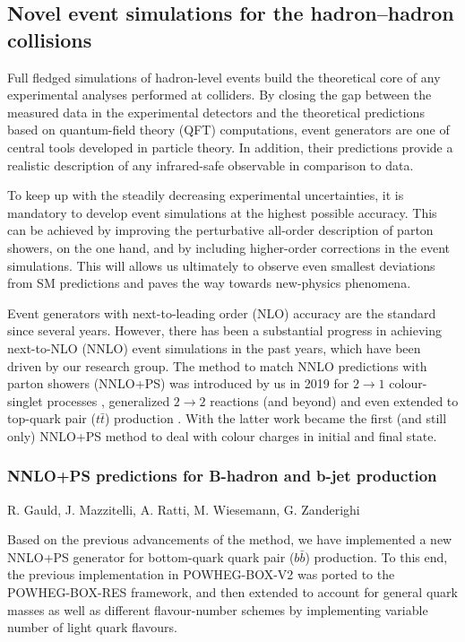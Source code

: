 \documentclass{FBR_Bericht_2025}
\begin{document}
\subsection{Novel event simulations for the hadron--hadron collisions}
\begin{refsection}
Full fledged simulations of hadron-level events build the theoretical 
core of any experimental analyses performed at colliders.
By closing the gap between the measured data in the experimental
detectors and the theoretical predictions based on quantum-field theory
(QFT) computations, event generators are one of central tools developed
in particle theory. In addition, their predictions provide a realistic description
of any infrared-safe observable in comparison to data.

To keep up with the steadily decreasing experimental uncertainties, it is 
mandatory to develop event simulations at the highest possible accuracy.
This can be achieved by improving the perturbative all-order description 
of parton showers, on the one hand, and by including higher-order corrections
in the event simulations. This will allows us ultimately to observe even smallest
deviations from SM predictions and paves the way towards new-physics phenomena.

Event generators with next-to-leading order (NLO) accuracy are the standard since 
several years. However, there has been a substantial progress in achieving next-to-NLO
(NNLO) event simulations in the past years, which have been driven by our research
group. The \minnlo{} method to match NNLO predictions with parton showers (NNLO+PS)
was introduced by us in 2019 for $2\to 1$ colour-singlet 
processes \cite{Monni2019:whf,MonniXXX}, generalized $2\to 2$ reactions 
(and beyond) \cite{Lombardi:} and even extended to top-quark pair ($t\bar t$) production \cite{Mazzitelli, Mazzitelli}. With the latter work \minnlo{} became the first 
(and still only) NNLO+PS method to deal with colour charges in initial and final state.
%
\subsubsection{NNLO+PS predictions for B-hadron and b-jet production}

\begin{Namen}
R. Gauld, J. Mazzitelli, A. Ratti, M. Wiesemann, G. Zanderighi
\end{Namen}

Based on the previous advancements of the \minnlo{} method,
we have implemented a new NNLO+PS generator for bottom-quark quark pair ($b\bar b$) production.
To this end, the previous \minnlo{} implementation in POWHEG-BOX-V2 was ported 
to the POWHEG-BOX-RES framework, and then extended to account for 
general quark masses as well as different flavour-number schemes by implementing
variable number of light quark flavours.



\end{refsection}
\end{document}
